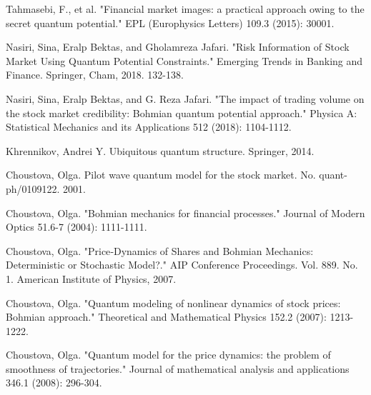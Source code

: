 \documentclass[a4paper,titlepage,12pt,fleqn,oneside]{report}
\begin{document}
\begin{thebibliography}{99}
\begin{LTRitems}
	Tahmasebi, F., et al. "Financial market images: a practical approach owing to the secret quantum potential." EPL (Europhysics Letters) 109.3 (2015): 30001.
\end{LTRitems}

\begin{LTRitems}
	Nasiri, Sina, Eralp Bektas, and Gholamreza Jafari. "Risk Information of Stock Market Using Quantum Potential Constraints." Emerging Trends in Banking and Finance. Springer, Cham, 2018. 132-138.
\end{LTRitems}

\begin{LTRitems}
	Nasiri, Sina, Eralp Bektas, and G. Reza Jafari. "The impact of trading volume on the stock market credibility: Bohmian quantum potential approach." Physica A: Statistical Mechanics and its Applications 512 (2018): 1104-1112.
\end{LTRitems}

\begin{LTRitems}
	Khrennikov, Andrei Y. Ubiquitous quantum structure. Springer, 2014.
\end{LTRitems}

\begin{LTRitems}
	Choustova, Olga. Pilot wave quantum model for the stock market. No. quant-ph/0109122. 2001.
\end{LTRitems}

\begin{LTRitems}
	Choustova, Olga. "Bohmian mechanics for financial processes." Journal of Modern Optics 51.6-7 (2004): 1111-1111.
\end{LTRitems}

\begin{LTRitems}
	Choustova, Olga. "Price‐Dynamics of Shares and Bohmian Mechanics: Deterministic or Stochastic Model?." AIP Conference Proceedings. Vol. 889. No. 1. American Institute of Physics, 2007.
\end{LTRitems}

\begin{LTRitems}
	Choustova, Olga. "Quantum modeling of nonlinear dynamics of stock prices: Bohmian approach." Theoretical and Mathematical Physics 152.2 (2007): 1213-1222.
\end{LTRitems}

\begin{LTRitems}
	Choustova, Olga. "Quantum model for the price dynamics: the problem of smoothness of trajectories." Journal of mathematical analysis and applications 346.1 (2008): 296-304.
\end{LTRitems}


\end{thebibliography}
\end{document}
